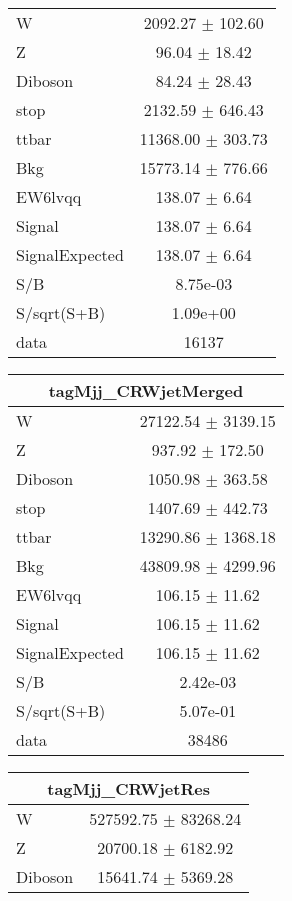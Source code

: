 \begin{table}
\begin{tabular}{|l|c|}
W & 2092.27 $\pm$ 102.60\\
Z & 96.04 $\pm$ 18.42\\
Diboson & 84.24 $\pm$ 28.43\\
stop & 2132.59 $\pm$ 646.43\\
ttbar & 11368.00 $\pm$ 303.73\\
\hline
Bkg & 15773.14 $\pm$ 776.66\\
\hline
EW6lvqq & 138.07 $\pm$ 6.64\\
\hline
Signal & 138.07 $\pm$ 6.64\\
SignalExpected & 138.07 $\pm$ 6.64\\
\hline
S/B & 8.75e-03\\
S/sqrt(S+B) & 1.09e+00\\
\hline
data & 16137\\ \hline
\end{tabular}
\begin{tabular}{|l|c|}
\hline
 \multicolumn{2}{|c|}{tagMjj\_CRWjetMerged}\\ \hline
W & 27122.54 $\pm$ 3139.15\\
Z & 937.92 $\pm$ 172.50\\
Diboson & 1050.98 $\pm$ 363.58\\
stop & 1407.69 $\pm$ 442.73\\
ttbar & 13290.86 $\pm$ 1368.18\\
\hline
Bkg & 43809.98 $\pm$ 4299.96\\
\hline
EW6lvqq & 106.15 $\pm$ 11.62\\
\hline
Signal & 106.15 $\pm$ 11.62\\
SignalExpected & 106.15 $\pm$ 11.62\\
\hline
S/B & 2.42e-03\\
S/sqrt(S+B) & 5.07e-01\\
\hline
data & 38486\\ \hline
\end{tabular}
\begin{tabular}{|l|c|}
\hline
 \multicolumn{2}{|c|}{tagMjj\_CRWjetRes}\\ \hline
W & 527592.75 $\pm$ 83268.24\\
Z & 20700.18 $\pm$ 6182.92\\
Diboson & 15641.74 $\pm$ 5369.28\\

\end{tabular}
\end{table}
